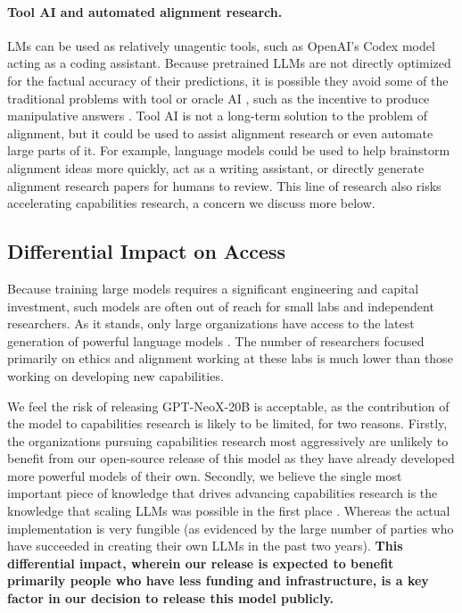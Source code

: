 \documentclass[11pt]{article}
\newcommand{\model}{GPT-NeoX-20B}
\begin{document}
\paragraph{Tool AI and automated alignment research.} LMs can be used as relatively unagentic tools, such as OpenAI's Codex model \citep{chen2021evaluating} acting as a coding assistant. Because pretrained LLMs are not directly optimized for the factual accuracy of their predictions, it is possible they avoid some of the traditional problems with tool or oracle AI \citep{Armstrong2012ThinkingIT}, such as the incentive to produce manipulative answers \citep{predictomatic}. Tool AI is not a long-term solution to the problem of alignment, but it could be used to assist alignment research or even automate large parts of it. For example, language models could be used to help brainstorm alignment ideas more quickly, act as a writing assistant, or directly generate alignment research papers for humans to review. This line of research also risks accelerating capabilities research, a concern we discuss more below.

\subsection{Differential Impact on Access}

Because training large models requires a significant engineering and capital investment, such models are often out of reach for small labs and independent researchers. As it stands, only large organizations have access to the latest generation of powerful language models \citep{brown2020language, rae2021gopher, fedus2021switch, lieber2021jurassic, WuDao}. The number of researchers focused primarily on ethics and alignment working at these labs is much lower than those working on developing new capabilities. 

We feel the risk of releasing \model{} is acceptable, as the contribution of the model to capabilities research is likely to be limited, for two reasons. Firstly, the organizations pursuing capabilities research most aggressively are unlikely to benefit from our open-source release of this model as they have already developed more powerful models of their own. Secondly, we believe the single most important piece of knowledge that drives advancing capabilities research is the knowledge that scaling LLMs was possible in the first place \citep{why-release,leahy2021hard}. Whereas the actual implementation is very fungible (as evidenced by the large number of parties who have succeeded in creating their own LLMs in the past two years). \textbf{This differential impact, wherein our release is expected to benefit primarily people who have less funding and infrastructure, is a key factor in our decision to release this model publicly.}
\end{document}
